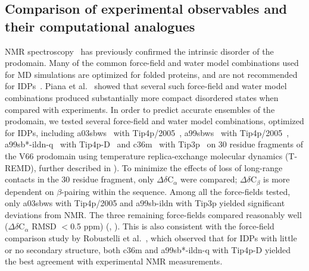 \documentclass[10pt,letterpaper]{article}
\begin{document}
\subsection*{Comparison of experimental observables and their computational analogues}

NMR spectroscopy~\cite{Anastasia2013} has previously confirmed the intrinsic disorder of the prodomain. Many of the common force-field and water model combinations used for MD simulations are optimized for folded proteins, and are not recommended for IDPs~\cite{Mercadante2015,Piana2015}. Piana et al.~\cite{Piana2015} showed that several such force-field and water model combinations produced substantially more compact disordered states when compared with experiments. In order to predict accurate ensembles of the prodomain, we tested several force-field and water model combinations, optimized for IDPs, including a03sbws~\cite{Best2009, Best2014} with Tip4p/2005~\cite{Abascal2005}, a99sbws~\cite{Lindorff-Larsen2010a, Best2014} with Tip4p/2005~\cite{Abascal2005}, a99sb*-ildn-q~\cite{Lindorff-Larsen2010a, Hornak2006a} with Tip4p-D~\cite{Piana2015} and c36m~\cite{Huang2016a} with Tip3p~\cite{Jorgensen1981} on 30 residue fragments of the V66 prodomain using temperature replica-exchange molecular dynamics (T-REMD), further described in ). To minimize the effects of loss of long-range contacts in the 30 residue fragment, only $\Delta$$\delta$C$_{\alpha}$ were compared; $\Delta$$\delta$C$_{\beta}$ is more dependent on $\beta$-pairing within the sequence. Among all the force-fields tested, only a03sbws with Tip4p/2005 and a99sb-ildn with Tip3p yielded significant deviations from NMR. The three remaining force-fields compared reasonably well ($\Delta$$\delta$C$_{\alpha}$ RMSD $<$0.5 ppm) (, ). This is also consistent with the force-field comparison study by Robustelli et al.~\cite{Robustelli2018}, which observed that for IDPs with little or no secondary structure, both c36m and a99sb*-ildn-q with Tip4p-D yielded the best agreement with experimental NMR measurements.
\end{document}
